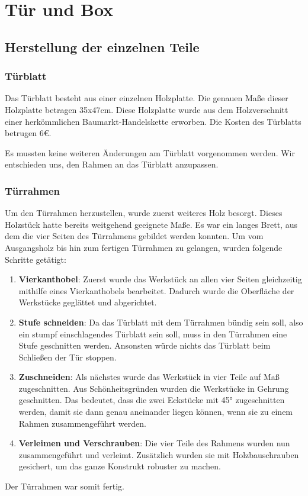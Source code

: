 \chapter{Tür und Box}
\section{Herstellung der einzelnen Teile}
\subsection{Türblatt}
Das Türblatt besteht aus einer einzelnen Holzplatte. Die genauen Maße dieser Holzplatte betragen 35x47cm.
Diese Holzplatte wurde aus dem Holzverschnitt einer herkömmlichen Baumarkt-Handelskette erworben. Die Kosten des
Türblatts betrugen 6€.

Es mussten keine weiteren Änderungen am Türblatt vorgenommen werden. Wir entschieden uns,
den Rahmen an das Türblatt anzupassen.

\subsection{Türrahmen}
Um den Türrahmen herzustellen, wurde zuerst weiteres Holz besorgt. Dieses Holzstück hatte bereits weitgehend geeignete Maße.
Es war ein langes Brett, aus dem die vier Seiten des Türrahmens gebildet werden konnten.
Um vom Ausgangsholz bis hin zum fertigen Türrahmen zu gelangen, wurden folgende Schritte getätigt:
\begin{enumerate}
    \item \textbf{Vierkanthobel}: Zuerst wurde das Werkstück an allen vier Seiten gleichzeitig mithilfe eines Vierkanthobels bearbeitet.
    Dadurch wurde die Oberfläche der Werkstücke geglättet und abgerichtet.
    \item \textbf{Stufe schneiden}: Da das Türblatt mit dem Türrahmen bündig sein soll, also ein stumpf einschlagendes Türblatt sein soll,
    muss in den Türrahmen eine Stufe geschnitten werden. Ansonsten würde nichts das Türblatt beim Schließen der Tür stoppen.
    \item \textbf{Zuschneiden}: Als nächstes wurde das Werkstück in vier Teile auf Maß zugeschnitten. Aus Schönheitsgründen wurden die
    Werkstücke in Gehrung geschnitten. Das bedeutet, dass die zwei Eckstücke mit 45° zugeschnitten werden, damit sie dann genau aneinander
    liegen können, wenn sie zu einem Rahmen zusammengeführt werden.
    \item \textbf{Verleimen und Verschrauben}: Die vier Teile des Rahmens wurden nun zusammengeführt und verleimt. Zusätzlich wurden sie mit
    Holzbauschrauben gesichert, um das ganze Konstrukt robuster zu machen.
\end{enumerate}
Der Türrahmen war somit fertig.

